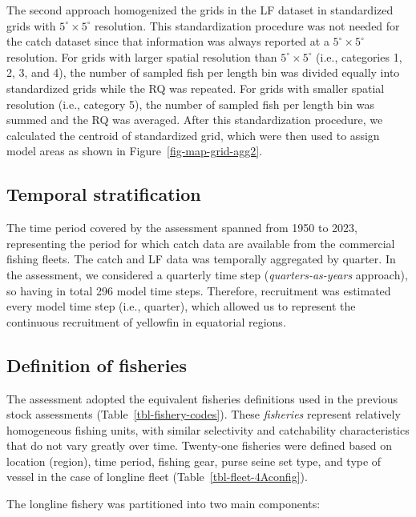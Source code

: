 \documentclass[
]{scrartcl}
\begin{document}
The second approach homogenized the grids in the LF dataset in
standardized grids with \(5^\circ\times 5^\circ\) resolution. This
standardization procedure was not needed for the catch dataset since
that information was always reported at a \(5^\circ\times 5^\circ\)
resolution. For grids with larger spatial resolution than
\(5^\circ\times 5^\circ\) (i.e., categories 1, 2, 3, and 4), the number
of sampled fish per length bin was divided equally into standardized
grids while the RQ was repeated. For grids with smaller spatial
resolution (i.e., category 5), the number of sampled fish per length bin
was summed and the RQ was averaged. After this standardization
procedure, we calculated the centroid of standardized grid, which were
then used to assign model areas as shown in
Figure~\ref{fig-map-grid-agg2}.

\subsection{Temporal stratification}\label{temporal-stratification}

The time period covered by the assessment spanned from 1950 to 2023,
representing the period for which catch data are available from the
commercial fishing fleets. The catch and LF data was temporally
aggregated by quarter. In the assessment, we considered a quarterly time
step (\emph{quarters-as-years} approach), so having in total 296 model
time steps. Therefore, recruitment was estimated every model time step
(i.e., quarter), which allowed us to represent the continuous
recruitment of yellowfin in equatorial regions.

\subsection{Definition of fisheries}\label{definition-of-fisheries}

The assessment adopted the equivalent fisheries definitions used in the
previous stock assessments (Table~\ref{tbl-fishery-codes}). These
\emph{fisheries} represent relatively homogeneous fishing units, with
similar selectivity and catchability characteristics that do not vary
greatly over time. Twenty-one fisheries were defined based on location
(region), time period, fishing gear, purse seine set type, and type of
vessel in the case of longline fleet (Table~\ref{tbl-fleet-4Aconfig}).

The longline fishery was partitioned into two main components:
\end{document}
